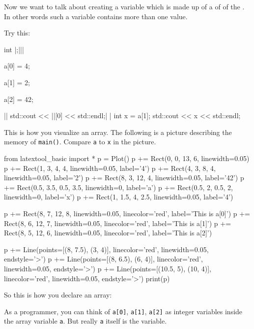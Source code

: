 Now we want to talk about creating a variable which is made up of a  of  of the . In other words such a variable contains more than one value.

Try this:
\begin{consolethree}[escapeinside=||]
int |\EMPHASIZE{[3]};|||
       
a[0] = 4;

a[1] = 2;

a[2] = 42;

||
std::cout << ||[0] << std::endl;|
|
int x = a[1];
std::cout << x << std::endl;  
\end{consolethree}

\newpage
This is how you visualize an array. The following is a picture describing the memory of \texttt{main()}. Compare \texttt{a} to \texttt{x} in the picture.
\begin{python}
from latextool_basic import *
p = Plot()
p += Rect(0, 0, 13, 6, linewidth=0.05)
p += Rect(1, 3, 4, 4, linewidth=0.05, label='4')
p += Rect(4, 3, 8, 4, linewidth=0.05, label='2')
p += Rect(8, 3, 12, 4, linewidth=0.05, label='42')
p += Rect(0.5, 3.5, 0.5, 3.5, linewidth=0, label='a')
p += Rect(0.5, 2, 0.5, 2, linewidth=0, label='x')
p += Rect(1, 1.5, 4, 2.5, linewidth=0.05, label='4')

p += Rect(8, 7, 12, 8, linewidth=0.05, linecolor='red', label='This is a[0]')
p += Rect(8, 6, 12, 7, linewidth=0.05, linecolor='red', label='This is a[1]')
p += Rect(8, 5, 12, 6, linewidth=0.05, linecolor='red', label='This is a[2]')

p += Line(points=[(8, 7.5), (3, 4)], linecolor='red', linewidth=0.05, endstyle='>')
p += Line(points=[(8, 6.5), (6, 4)], linecolor='red', linewidth=0.05, endstyle='>')
p += Line(points=[(10.5, 5), (10, 4)], linecolor='red', linewidth=0.05, endstyle='>')
print(p)
\end{python}
So this is how you declare an array:
\begin{center}
\end{center}
As a programmer, you can think of \texttt{a[0]}, \texttt{a[1]}, \texttt{a[2]} as integer variables inside the array variable \texttt{a}. But really \texttt{a} itself is the variable.

